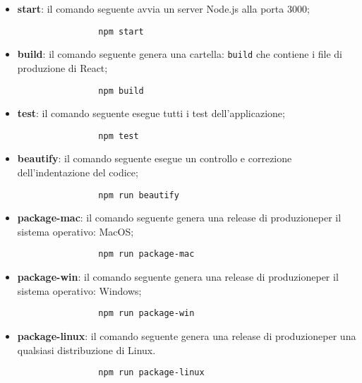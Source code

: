 \begin{itemize}
\begin{itemize}
\begin{verbatim}
            \end{verbatim}
            \item \textbf{start}: il comando seguente avvia un server Node.js alla porta 3000;
            \begin{verbatim}
	            npm start
            \end{verbatim}
            \item \textbf{build}: il comando seguente genera una cartella: \verb|build| che contiene i file di produzione di React;
            \begin{verbatim}
            	npm build
            \end{verbatim}
            \item \textbf{test}: il comando seguente esegue tutti i test dell'applicazione;\\
            \begin{verbatim}
            	npm test
            \end{verbatim}
            \item \textbf{beautify}: il comando seguente esegue un controllo e correzione dell'indentazione del codice;\\
            \begin{verbatim}
            	npm run beautify
            \end{verbatim}
            \item \textbf{package-mac}: il comando seguente genera una release di produzione\glosp per il sistema operativo: MacOS;
            \begin{verbatim}
            	npm run package-mac
            \end{verbatim}
            \item \textbf{package-win}: il comando seguente genera una release di produzione\glosp per il sistema operativo: Windows;
            \begin{verbatim}
            	npm run package-win
            \end{verbatim}
            \item \textbf{package-linux}: il comando seguente genera una release di produzione\glosp per una qualsiasi distribuzione di Linux.
            \begin{verbatim}
            	npm run package-linux
            \end{verbatim}
        \end{itemize}
\end{itemize}

